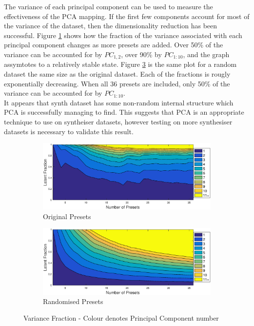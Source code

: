 \documentclass[11pt, oneside]{report}   	%
\begin{document}
The variance of each principal component can be used to measure the effectiveness of the PCA mapping. If the first few components account for most of the variance of the dataset, then the dimensionality reduction has been successful.
Figure \ref{fig:LatentOriginal} shows how the fraction of the variance associated with each principal component changes as more presets are added. Over 50\% of the variance can be accounted for by $PC_{1,2}$,  over 90\% by $PC_{1 : 10}$, and the graph assymtotes to a relatively stable state. Figure \ref{fig:LatentRandom} is the same plot for a random dataset the same size as the original dataset. Each of the fractions is rougly exponentially decreasing. When all 36 presets are included, only 50\% of the variance can be accounted for by $PC_{1 : 10}$. \\
It appears that synth dataset has some non-random internal structure which PCA is successfully managing to find. This suggests that PCA is an appropriate technique to use on syntheiser datasets, however testing on more synthesiser datasets is necessary to validate this result.
\begin{figure}[h]
	\vspace{-25pt}
	\hspace{-40pt}
	\begin{subfigure}{3.5in}
		\includegraphics[trim = {0, 0.1cm, 0, 0.5cm}, clip, width = \textwidth]{LatentFraction.eps}
		\caption{Original Presets}
		\label{fig:LatentOriginal}
	\end{subfigure} 
%
	\begin{subfigure}{3.5in}
		\includegraphics[trim = {0, 0.1cm, 0, 0.5cm}, clip, width = \textwidth]{LatentFractionRandom.eps}
		\caption{Randomised Presets}
		\label{fig:LatentRandom}
	\end{subfigure}
	\caption{Variance Fraction - Colour denotes Principal Component number}
\end{figure}
\end{document}
